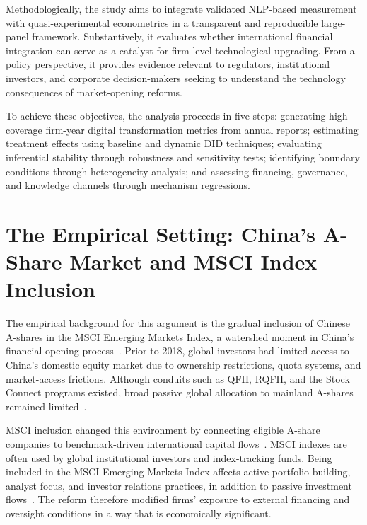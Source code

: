 Methodologically, the study aims to integrate validated NLP-based measurement with quasi-experimental econometrics in a transparent and reproducible large-panel framework. Substantively, it evaluates whether international financial integration can serve as a catalyst for firm-level technological upgrading. From a policy perspective, it provides evidence relevant to regulators, institutional investors, and corporate decision-makers seeking to understand the technology consequences of market-opening reforms.

To achieve these objectives, the analysis proceeds in five steps: generating high-coverage firm-year digital transformation metrics from annual reports; estimating treatment effects using baseline and dynamic DID techniques; evaluating inferential stability through robustness and sensitivity tests; identifying boundary conditions through heterogeneity analysis; and assessing financing, governance, and knowledge channels through mechanism regressions.

\section{The Empirical Setting: China's A-Share Market and MSCI Index Inclusion}

The empirical background for this argument is the gradual inclusion of Chinese A-shares in the MSCI Emerging Markets Index, a watershed moment in China's financial opening process~\cite{YLiu2024}. Prior to 2018, global investors had limited access to China's domestic equity market due to ownership restrictions, quota systems, and market-access frictions. Although conduits such as QFII, RQFII, and the Stock Connect programs existed, broad passive global allocation to mainland A-shares remained limited~\cite{Awokuse2009}.

MSCI inclusion changed this environment by connecting eligible A-share companies to benchmark-driven international capital flows~\cite{Wei2020}. MSCI indexes are often used by global institutional investors and index-tracking funds. Being included in the MSCI Emerging Markets Index affects active portfolio building, analyst focus, and investor relations practices, in addition to passive investment flows~\cite{PLi2023}. The reform therefore modified firms' exposure to external financing and oversight conditions in a way that is economically significant.


